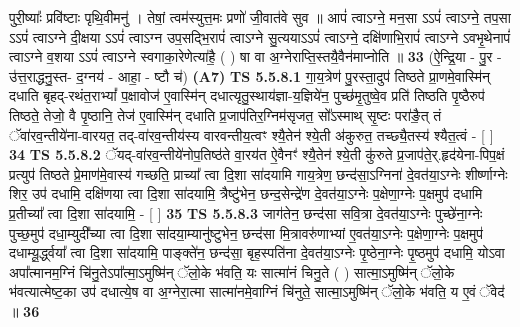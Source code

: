\documentclass[17pt]{extarticle}
\begin{document}
                  पुरी॒ष्याः᳚ प्रवि॑ष्टाः पृथि॒वीमनु॑ । तेषां॒ त्वम॑स्युत्त॒मः प्रणो॑ जी॒वात॑वे सुव ॥ आपं॑ त्वाऽग्ने॒ मन॒सा ऽऽपं॑ त्वाऽग्ने॒ तप॒सा ऽऽपं॑ त्वाऽग्ने दी॒क्षया ऽऽपं॑ त्वाऽग्न उप॒सद्भि॒रापं॑ त्वाऽग्ने सु॒त्ययाऽऽपं॑ त्वाऽग्ने॒ दक्षि॑णाभि॒रापं॑ त्वाऽग्ने ऽवभृ॒थेनापं॑ त्वाऽग्ने व॒शया ऽऽपं॑ त्वाऽग्ने स्वगाका॒रेणेत्या॑है॒ ( ) षा वा अ॒ग्नेराप्ति॒स्तयै॒वैन॑माप्नोति ॥ \textbf{  33 } \newline
                  \newline
                      (ऐ॒न्द्रि॒या - पु॒र - उ॑त्त॒राद्धनु॒स्त- द॒ग्नय॑ - आहा॒ - ष्टौ च॑)  \textbf{(A7)} \newline \newline
                                        \textbf{ TS 5.5.8.1} \newline
                  गा॒य॒त्रेण॑ पु॒रस्ता॒दुप॑ तिष्ठते प्रा॒णमे॒वास्मि॑न् दधाति बृहद्-रथंत॒राभ्यां᳚ प॒क्षावोज॑ ए॒वास्मि॑न् दधात्यृतु॒स्थाय॑ज्ञा-य॒ज्ञिये॑न॒ पुच्छ॑मृ॒तुष्वे॒व प्रति॑ तिष्ठति पृ॒ष्ठैरुप॑ तिष्ठते॒ तेजो॒ वै पृ॒ष्ठानि॒ तेज॑ ए॒वास्मि॑न् दधाति प्र॒जाप॑तिर॒ग्निम॑सृजत॒ सो᳚ऽस्माथ् सृ॒ष्टः परा॑ङै॒त् तं ॅवा॑रव॒न्तीये॑ना-वारयत॒ तद्-वा॑रव॒न्तीय॑स्य वारवन्तीय॒त्वꣳ श्यै॒तेन॑ श्ये॒ती अ॑कुरुत॒ तच्छ्यै॒तस्य॑ श्यैत॒त्वं - [  ] \textbf{  34} \newline
                  \newline
                                \textbf{ TS 5.5.8.2} \newline
                  ॅयद्-वा॑रव॒न्तीये॑नोप॒तिष्ठ॑ते वा॒रय॑त ऐ॒वैनꣳ॑ श्यै॒तेन॑ श्ये॒ती कु॑रुते प्र॒जाप॑ते॒र्.हृद॑येना-पिप॒क्षं प्रत्युप॑ तिष्ठते प्रे॒माण॑मे॒वास्य॑ गच्छति॒ प्राच्या᳚ त्वा दि॒शा सा॑दयामि गाय॒त्रेण॒ छन्द॑सा॒ऽग्निना॑ दे॒वत॑या॒ऽग्नेः शीर्ष्णाग्नेः शिर॒ उप॑ दधामि॒ दक्षि॑णया त्वा दि॒शा सा॑दयामि॒ त्रैष्टु॑भेन॒ छन्द॒सेन्द्रे॑ण दे॒वत॑या॒ऽग्नेः प॒क्षेणा॒ग्नेः प॒क्षमुप॑ दधामि प्र॒तीच्या᳚ त्वा दि॒शा सा॑दयामि॒ - [  ] \textbf{  35} \newline
                  \newline
                                \textbf{ TS 5.5.8.3} \newline
                  जाग॑तेन॒ छन्द॑सा सवि॒त्रा दे॒वत॑या॒ऽग्नेः पुच्छे॑ना॒ग्नेः पुच्छ॒मुप॑ दधा॒म्युदी᳚च्या त्वा दि॒शा सा॑दया॒म्यानु॑ष्टुभेन॒ छन्द॑सा मि॒त्रावरु॑णाभ्यां ए॒वत॑या॒ऽग्नेः प॒क्षेणा॒ग्नेः प॒क्षमुप॑ दधाम्यू॒र्द्ध्वया᳚ त्वा दि॒शा सा॑दयामि॒ पाङ्क्ते॑न॒ छन्द॑सा॒ बृह॒स्पति॑ना दे॒वत॑या॒ऽग्नेः पृ॒ष्ठेना॒ग्नेः पृ॒ष्ठमुप॑ दधामि॒ योऽवा अपा᳚त्मानम॒ग्निं चि॑नु॒तेऽपा᳚त्मा॒ऽमुष्मि॑न् ॅलो॒के भ॑वति॒ यः सात्मा॑नं चिनु॒ते ( ) सात्मा॒ऽमुष्मि॑न् ॅलो॒के भ॑वत्यात्मेष्ट॒का उप॑ दधात्ये॒ष वा अ॒ग्नेरा॒त्मा सात्मा॑नमे॒वाग्निं चि॑नुते॒ सात्मा॒ऽमुष्मि॑न् ॅलो॒के भ॑वति॒ य ए॒वं ॅवेद॑ ॥ \textbf{  36 } \newline
\end{document}
